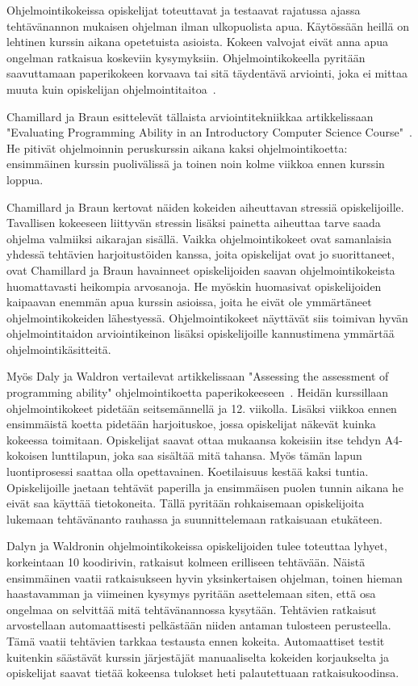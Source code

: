 \documentclass[finnish]{../tktltiki2}
\theoremstyle{definition}
\theoremstyle{remark}
\begin{document}
Ohjelmointikokeissa opiskelijat toteuttavat ja testaavat rajatussa ajassa tehtävänannon mukaisen ohjelman ilman ulkopuolista apua. Käytössään heillä on lehtinen kurssin aikana opetetuista asioista. Kokeen valvojat eivät anna apua ongelman ratkaisua koskeviin kysymyksiin. Ohjelmointikokeella pyritään saavuttamaan paperikokeen korvaava tai sitä täydentävä arviointi, joka ei mittaa muuta kuin opiskelijan ohjelmointitaitoa~\cite{CB00, DW04}.

Chamillard ja Braun esittelevät tällaista arviointitekniikkaa artikkelissaan "Evaluating Programming Ability in an Introductory Computer Science Course"~\cite{CB00}. He pitivät ohjelmoinnin peruskurssin aikana kaksi ohjelmointikoetta: ensimmäinen kurssin puolivälissä ja toinen noin kolme viikkoa ennen kurssin loppua.

Chamillard ja Braun kertovat näiden kokeiden aiheuttavan stressiä opiskelijoille. Tavallisen kokeeseen liittyvän stressin lisäksi painetta aiheuttaa tarve saada ohjelma valmiiksi aikarajan sisällä. Vaikka ohjelmointikokeet ovat samanlaisia yhdessä tehtävien harjoitustöiden kanssa, joita opiskelijat ovat jo suorittaneet, ovat Chamillard ja Braun havainneet opiskelijoiden saavan ohjelmointikokeista huomattavasti heikompia arvosanoja. He myöskin huomasivat opiskelijoiden kaipaavan enemmän apua kurssin asioissa, joita he eivät ole ymmärtäneet ohjelmointikokeiden lähestyessä. Ohjelmointikokeet näyttävät siis toimivan hyvän ohjelmointitaidon arviointikeinon lisäksi opiskelijoille kannustimena ymmärtää ohjelmointikäsitteitä.

Myös Daly ja Waldron vertailevat artikkelissaan "Assessing the assessment of programming ability" ohjelmointikoetta paperikokeeseen~\cite{DW04}. Heidän kurssillaan ohjelmointikokeet pidetään seitsemännellä ja 12. viikolla. Lisäksi viikkoa ennen ensimmäistä koetta pidetään harjoituskoe, jossa opiskelijat näkevät kuinka kokeessa toimitaan. Opiskelijat saavat ottaa mukaansa kokeisiin itse tehdyn A4-kokoisen lunttilapun, joka saa sisältää mitä tahansa. Myös tämän lapun luontiprosessi saattaa olla opettavainen. Koetilaisuus kestää kaksi tuntia. Opiskelijoille jaetaan tehtävät paperilla ja ensimmäisen puolen tunnin aikana he eivät saa käyttää tietokoneita. Tällä pyritään rohkaisemaan opiskelijoita lukemaan tehtävänanto rauhassa ja suunnittelemaan ratkaisuaan etukäteen.

Dalyn ja Waldronin ohjelmointikokeissa opiskelijoiden tulee toteuttaa lyhyet, korkeintaan 10 koodirivin, ratkaisut kolmeen erilliseen tehtävään. Näistä ensimmäinen vaatii ratkaisukseen hyvin yksinkertaisen ohjelman, toinen hieman haastavamman ja viimeinen kysymys pyritään asettelemaan siten, että osa ongelmaa on selvittää mitä tehtävänannossa kysytään. Tehtävien ratkaisut arvostellaan automaattisesti pelkästään niiden antaman tulosteen perusteella. Tämä vaatii tehtävien tarkkaa testausta ennen kokeita. Automaattiset testit kuitenkin säästävät kurssin järjestäjät manuaaliselta kokeiden korjaukselta ja opiskelijat saavat tietää kokeensa tulokset heti palautettuaan ratkaisukoodinsa.
\end{document}
